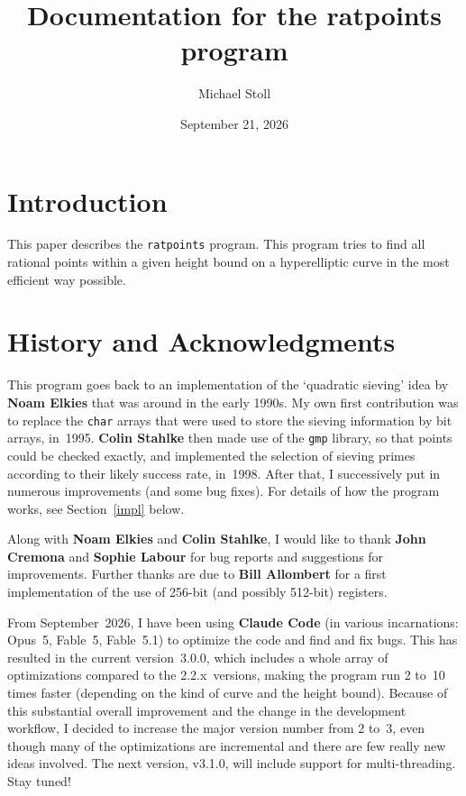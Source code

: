 \documentclass[12pt,a4paper,oneside]{amsart}
\begin{document}
\title{Documentation for the ratpoints program}

\author{Michael Stoll}
\address{Mathematisches Institut,
         Universit\"at Bayreuth,
         95440 Bayreuth, Germany.}
\date{September 21, 2026}

\maketitle


\section{Introduction}

This paper describes the \texttt{ratpoints} program. This program tries to
find all rational points within a given height bound on a hyperelliptic
curve in the most efficient way possible.


\section{History and Acknowledgments}

This program goes back to an implementation of the `quadratic sieving'
idea by \textbf{Noam Elkies} that was around in the early 1990s. My own
first contribution was to replace the \texttt{char} arrays that were used
to store the sieving information by bit arrays, in~1995. \textbf{Colin Stahlke}
then made use of the \texttt{gmp} library, so that points could be checked
exactly, and implemented the selection of sieving primes according to
their likely success rate, in~1998. After that, I successively put in
numerous improvements (and some bug fixes). For details of how the
program works, see Section~\ref{impl} below.

Along with \textbf{Noam Elkies} and \textbf{Colin Stahlke}, I would like to
thank \textbf{John Cremona} and \textbf{Sophie Labour} for bug reports and
suggestions for improvements. Further thanks are due to \textbf{Bill Allombert}
for a first implementation of the use of 256-bit (and possibly 512-bit) registers.

From September~2026, I have been using \textbf{Claude Code} (in various
incarnations: Opus~5, Fable~5, Fable~5.1) to optimize the code and find and fix
bugs. This has resulted in the current version~3.0.0, which includes
a whole array of optimizations compared to the 2.2.x~versions, making
the program run 2 to~10 times faster (depending on the kind
of curve and the height bound). Because of this substantial overall
improvement and the change in the development workflow, I decided to
increase the major version number from 2 to~3, even though many of
the optimizations are incremental and there are few really new ideas involved.
The next version, v3.1.0, will include support for multi-threading.
Stay tuned!
\end{document}
